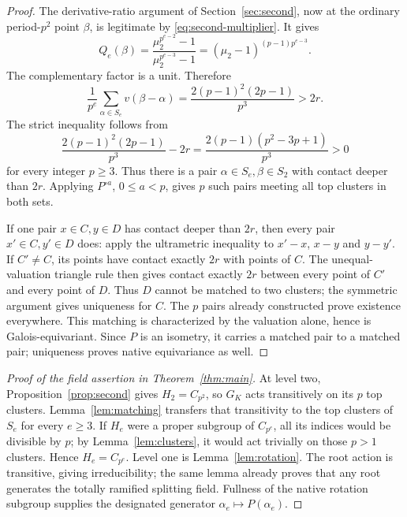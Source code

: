 \begin{proof}
The derivative-ratio argument of Section~\ref{sec:second},
now at the ordinary period-\(p^2\) point \(\beta\), is legitimate
by \eqref{eq:second-multiplier}. It gives
\[
 Q_e(\beta)
 =\frac{\mu_2^{p^{e-2}}-1}{\mu_2^{p^{e-3}}-1}
 =(\mu_2-1)^{(p-1)p^{e-3}} .
\]
The complementary factor is a unit. Therefore
\[
 \frac1{p^e}\sum_{\alpha\in S_e}v(\beta-\alpha)
 =\frac{2(p-1)^2(2p-1)}{p^3}>2r.
\]
The strict inequality follows from
\[
 \frac{2(p-1)^2(2p-1)}{p^3}-2r
 =\frac{2(p-1)(p^2-3p+1)}{p^3}>0
\]
for every integer \(p\ge3\). Thus there is a pair
\(\alpha\in S_e,\beta\in S_2\) with contact deeper than \(2r\).
Applying \(P^{\circ a}\), \(0\le a<p\), gives \(p\) such pairs
meeting all top clusters in both sets.

If one pair \(x\in C,y\in D\) has contact deeper than \(2r\),
then every pair \(x'\in C,y'\in D\) does: apply the
ultrametric inequality to \(x'-x\), \(x-y\) and \(y-y'\).
If \(C'\ne C\), its points have contact exactly \(2r\) with
points of \(C\). The unequal-valuation triangle rule then
gives contact exactly \(2r\) between every point of \(C'\)
and every point of \(D\). Thus \(D\) cannot be matched to
two clusters; the symmetric argument gives uniqueness for \(C\).
The \(p\) pairs already constructed prove existence everywhere.
This matching is characterized by the valuation alone, hence
is Galois-equivariant. Since \(P\) is an isometry, it carries
a matched pair to a matched pair; uniqueness proves native
equivariance as well.
\end{proof}

\begin{proof}[Proof of the field assertion in Theorem~\ref{thm:main}]
At level two, Proposition~\ref{prop:second} gives
\(H_2=C_{p^2}\), so \(G_K\) acts transitively on its \(p\)
top clusters. Lemma~\ref{lem:matching} transfers that
transitivity to the top clusters of \(S_e\) for every \(e\ge3\).
If \(H_e\) were a proper subgroup of \(C_{p^e}\), all its
indices would be divisible by \(p\); by
Lemma~\ref{lem:clusters}, it would act trivially on those
\(p>1\) clusters. Hence \(H_e=C_{p^e}\).
Level one is Lemma~\ref{lem:rotation}.
The root action is transitive, giving irreducibility; the
same lemma already proves that any root generates the
totally ramified splitting field. Fullness of the native
rotation subgroup supplies the designated generator
\(\alpha_e\mapsto P(\alpha_e)\).
\end{proof}
